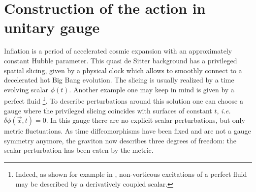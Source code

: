 \documentclass[12pt,letterpaper]{article}
\begin{document}
{\section{Construction of the action in unitary gauge}
Inflation is a period of accelerated cosmic expansion with an
approximately constant Hubble parameter. This quasi de Sitter
background has a privileged spatial slicing, given by a physical clock
which allows to smoothly connect to a decelerated hot Big Bang
evolution. The slicing is usually realized by a time evolving scalar
$\phi(t)$. Another example one may keep in mind is given by a perfect fluid \footnote{Indeed, as
shown for example in \cite{Dubovsky:2005xd}, non-vorticous excitations of a perfect fluid may
be described by a derivatively coupled scalar.}. To describe perturbations around this solution one can choose a gauge where the privileged slicing coincides with surfaces of constant $t$, {\em i.e.} $\delta\phi(\vec x,t)=0$. In this gauge there are no explicit scalar perturbations, but only metric fluctuations. As time diffeomorphisms have been fixed and are not a gauge symmetry anymore, the graviton now describes three degrees of freedom: the scalar perturbation has been eaten by the metric. 

}
\end{document}
